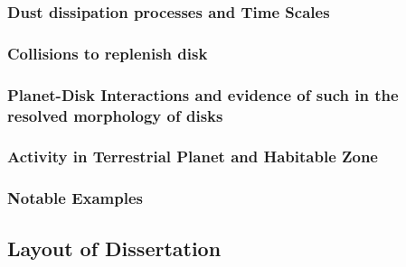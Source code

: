         \subsubsection{Dust dissipation processes and Time Scales}
        
        \subsubsection{Collisions to replenish disk}
        
        \subsubsection{Planet-Disk Interactions and evidence of such in the resolved morphology of disks}
    
    
        \subsubsection{Activity in Terrestrial Planet and Habitable Zone}
        
        
        \subsubsection{Notable Examples}

    \subsection{Layout of Dissertation}

        
